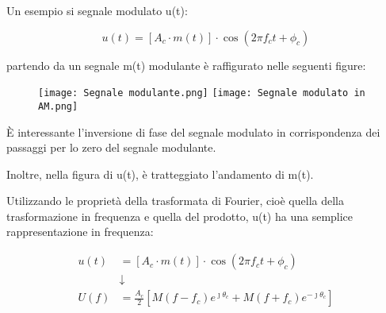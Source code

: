 Un esempio si segnale modulato u(t): 

{
    \Large 
    \begin{equation}
        u (t) 
        = 
        \left[A_c \cdot m(t) \right] \cdot \cos(2 \pi f_c t + \phi_c)
    \end{equation}
}

partendo da un segnale m(t) modulante è raffigurato nelle seguenti figure: 

\begin{figure}[h]
    \centering
    \texttt{[image: Segnale modulante.png]}
    \texttt{[image: Segnale modulato in AM.png]}
\end{figure}

È interessante l'inversione di fase del segnale modulato in corrispondenza dei passaggi per lo zero del segnale modulante. \newline 

Inoltre, nella figura di u(t), è tratteggiato l'andamento di m(t). \newline 

Utilizzando le proprietà della trasformata di Fourier, cioè quella della trasformazione in frequenza e quella del prodotto,
u(t) ha una semplice rappresentazione in frequenza: 

{
    \Large 
    \begin{equation}
        \begin{split}
        u (t) 
        &= 
        \left[A_c \cdot m(t) \right] \cdot \cos(2 \pi f_c t + \phi_c)
        \\
        &\downarrow
        \\
        U(f)
        &=
        \frac{A_c}{2}
        \left[
            M (f - f_c) e^{\jmath \theta_c}
            +
            M (f + f_c) e^{-\jmath \theta_c}
        \right]
        \end{split}
    \end{equation}
}


